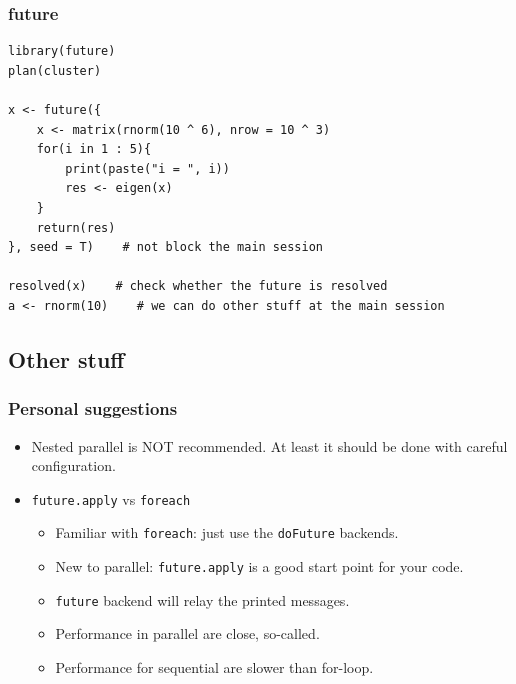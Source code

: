 \documentclass[aspectratio=169,xcolor={dvipsnames,table}]{beamer}
\begin{document}
\begin{frame}[fragile]
  \frametitle{future}
\begin{verbatim}
library(future)
plan(cluster)

x <- future({
    x <- matrix(rnorm(10 ^ 6), nrow = 10 ^ 3)
    for(i in 1 : 5){
        print(paste("i = ", i))
        res <- eigen(x) 
    }
    return(res)
}, seed = T)    # not block the main session

resolved(x)    # check whether the future is resolved
a <- rnorm(10)    # we can do other stuff at the main session
\end{verbatim}
\end{frame}

\subsection{Other stuff}
\begin{frame}
  \frametitle{Personal suggestions}
  \begin{itemize}
  \item Nested parallel is {\color{Brown}NOT} recommended. At least it should be done with careful configuration.
  \item \texttt{future.apply} vs \texttt{foreach}
    \begin{itemize}
    \item Familiar with \texttt{foreach}: just use the \texttt{doFuture} backends.
    \item New to parallel: \texttt{future.apply} is a good start point for your code.
    \item \texttt{future} backend will relay the printed messages.
    \item Performance in parallel are close, {\color{Brown} so-called}.
    \item Performance for sequential are slower than for-loop.
    \end{itemize}
  \end{itemize}
\end{frame}
\end{document}
